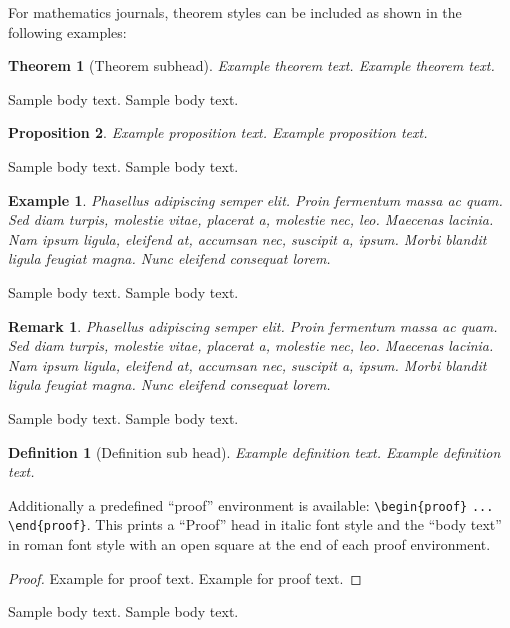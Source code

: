 \documentclass[ml4h-mathphys]{ml4h-jnl}%
\theoremstyle{thmstyleone}%
\newtheorem{theorem}{Theorem}%
\newtheorem{proposition}[theorem]{Proposition}%
\theoremstyle{thmstyletwo}%
\newtheorem{example}{Example}%
\newtheorem{remark}{Remark}%
\theoremstyle{thmstylethree}%
\newtheorem{definition}{Definition}%
\begin{document}
For mathematics journals, theorem styles can be included as shown in the following examples:

\begin{theorem}[Theorem subhead]\label{thm1}
Example theorem text. Example theorem text. 
\end{theorem}

Sample body text. Sample body text.

\begin{proposition}
Example proposition text. Example proposition text. 
\end{proposition}

Sample body text. Sample body text. 

\begin{example}
Phasellus adipiscing semper elit. Proin fermentum massa
ac quam. Sed diam turpis, molestie vitae, placerat a, molestie nec, leo. Maecenas lacinia. Nam ipsum ligula, eleifend at, accumsan nec, suscipit a, ipsum. Morbi blandit ligula feugiat magna. Nunc eleifend consequat lorem. 
\end{example}

Sample body text. Sample body text. 

\begin{remark}
Phasellus adipiscing semper elit. Proin fermentum massa
ac quam. Sed diam turpis, molestie vitae, placerat a, molestie nec, leo. Maecenas lacinia. Nam ipsum ligula, eleifend at, accumsan nec, suscipit a, ipsum. Morbi blandit ligula feugiat magna. Nunc eleifend consequat lorem. 
\end{remark}

Sample body text. Sample body text. 

\begin{definition}[Definition sub head]
Example definition text. Example definition text.
\end{definition}

Additionally a predefined ``proof'' environment is available: \verb+\begin{proof}+ \verb+...+ \verb+\end{proof}+. This prints a ``Proof'' head in italic font style and the ``body text'' in roman font style with an open square at the end of each proof environment. 

\begin{proof}
Example for proof text. Example for proof text. 
\end{proof}

Sample body text. Sample body text. 
\end{document}
